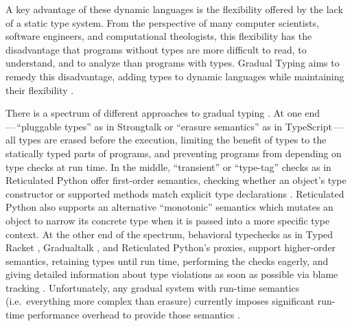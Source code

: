 
A key advantage of these dynamic languages is the flexibility offered
by the lack of a static type system. 
From the perspective of many computer scientists, software engineers,
and computational theologists, this flexibility has the
disadvantage that programs without types are more
difficult to read, to understand, and to analyze than programs with
types. Gradual Typing aims to remedy this disadvantage, adding types
to dynamic languages while maintaining their flexibility
\citep{GiladPluggable2004,Siek2006,XXXSiek2015}. 

There is a spectrum of different approaches to gradual typing
\cite{kafka18,bensurvey18icfp}.
At one end\,---\,``pluggable types'' as in Strongtalk \cite{strongtalk} or ``erasure
semantics'' as in 
TypeScript\citep{typeScriptECOOP}\,---\,
%
all types are erased before the execution, limiting the benefit of
types to the statically typed parts of programs, and preventing
programs from depending on type checks at run time.  In the middle,
``transient'' or ``type-tag'' checks as in Reticulated Python 
offer first-order semantics, checking
whether an object's type constructor or supported methods match
explicit type declarations
\cite{Siek2007,Bloom2009,concrete15,reticPython2014,Greenman2018}.
Reticulated Python also supports an alternative ``monotonic'' semantics
which mutates an object to narrow its concrete type when it is passed
into a more specific type context.
At the other end of the spectrum, behavioral
typechecks as in Typed Racket \cite{typedScheme08,takikawa2012},
Gradualtalk \cite{gradualtalk14},
and Reticulated Python's proxies,
support higher-order semantics, retaining
types until run 
time, performing the checks eagerly, and giving detailed information
about type violations as soon as possible via blame
tracking \cite{blame2009,blameForAll2011}.
%
%
Unfortunately, any gradual system with run-time semantics
(i.e.\ everything more complex than erasure) currently
imposes significant run-time performance overhead to provide those semantics
\citep{Takikawa2016,Vitousek2017,Muehlboeck2017,Bauman2017,Richards2017,Stulova2016,Greenman2018}.

